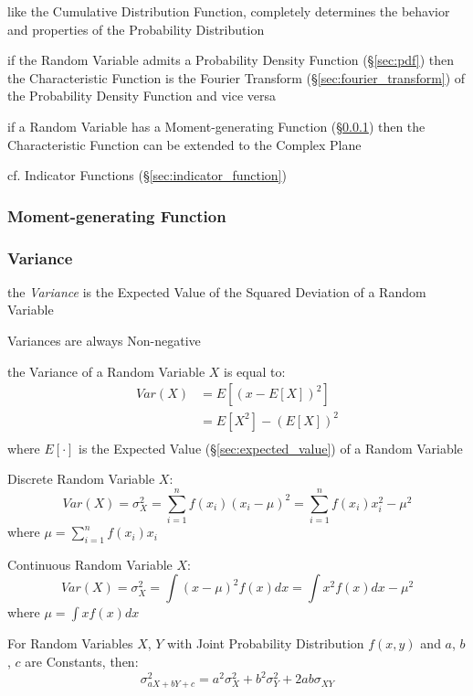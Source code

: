 like the Cumulative Distribution Function, completely determines the behavior
and properties of the Probability Distribution

if the Random Variable admits a Probability Density Function
(\S\ref{sec:pdf}) then the Characteristic Function is the
Fourier Transform (\S\ref{sec:fourier_transform}) of the Probability Density
Function and vice versa

if a Random Variable has a Moment-generating Function
(\S\ref{sec:moment_generating_function}) then the Characteristic Function can be
extended to the Complex Plane

\fist cf. Indicator Functions (\S\ref{sec:indicator_function})



\subsubsection{Moment-generating Function}\label{sec:moment_generating_function}

\subsubsection{Variance}\label{sec:variance}

the \emph{Variance} is the Expected Value of the Squared Deviation of a Random
Variable

Variances are always Non-negative

the Variance of a Random Variable $X$ is equal to:
\begin{align*}
  Var(X) & = E[(x - E[X])^2] \\
         & = E[X^2] - (E[X])^2 \\
\end{align*}
where $E[\cdot]$ is the Expected Value (\S\ref{sec:expected_value}) of a
Random Variable

Discrete Random Variable $X$:
\[
  Var(X) = \sigma_X^2 = \sum_{i=1}^n f(x_i) (x_i - \mu)^2 = \sum_{i=1}^n
  f(x_i) x_i^2 - \mu^2
\]
where $\mu = \sum_{i=1}^n f(x_i) x_i$

Continuous Random Variable $X$:
\[
  Var(X) = \sigma_X^2 = \int (x - \mu)^2 f(x) dx = \int x^2 f(x) dx -
  \mu^2
\]
where $\mu = \int x f(x) dx$

For Random Variables $X$, $Y$ with Joint Probability Distribution
$f(x,y)$ and $a$, $b$, $c$ are Constants, then:
\[
  \sigma^2_{a X + b Y + c} = a^2 \sigma^2_X + b^2 \sigma^2_Y + 2ab
  \sigma_{X Y}
\]



